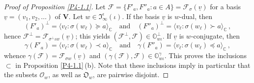 \documentclass{amsart}
\theoremstyle{definition}
\newcommand{\bs}[1]{\boldsymbol{#1}}
\begin{document}
\begin{proof}[Proof of Proposition \ref{P4-1.1}]
Let $\mathcal{F}=\{F'_a,F''_a:a\in A\}=\mathcal{F}_\sigma(\underline{v})$ for a basis $\underline{v}=(v_1,v_2,\ldots)$ of $\mathbf{V}$.
Let $w\in\mathfrak{I}_\infty^\epsilon(\iota)$.
If the basis $\underline{v}$ is $w$-dual, then 
\[
(F'_a)^\perp=\langle v_\ell:\sigma(w_\ell)\succeq a\rangle_\mathbb{C}
\quad\mbox{and}\quad
(F''_a)^\perp=\langle v_\ell:\sigma(w_\ell)\succ a\rangle_\mathbb{C}\,,
\]
hence $\mathcal{F}^\perp=\mathcal{F}_{\sigma^\perp\iota w}(\underline{v})$;
this yields
$(\mathcal{F}^\perp,\mathcal{F})\in\pmb{\mathbb{O}}^\perp_{w\iota}$.
If $\underline{v}$ is $w$-conjugate, then
\[
\gamma(F'_a)=\langle v_\ell:\sigma(w_\ell)\prec a\rangle_\mathbb{C}
\quad\mbox{and}\quad
\gamma(F''_a)=\langle v_\ell:\sigma(w_\ell)\preceq a\rangle_\mathbb{C}\,,
\]
whence $\gamma(\mathcal{F})=\mathcal{F}_{\sigma w}(\underline{v})$
and
$(\gamma(\mathcal{F}),\mathcal{F})\in\pmb{\mathbb{O}}^\gamma_{w\iota}$.
This proves the inclusions $\subset$ in Proposition \ref{P4-1.1}\,{\rm (b)}.
Note that these inclusions imply in particular that the subsets $\bs{\mathcal{O}}_w$, as well as $\bs{\mathfrak{O}}_w$, are pairwise disjoint.


\end{proof}
\end{document}
